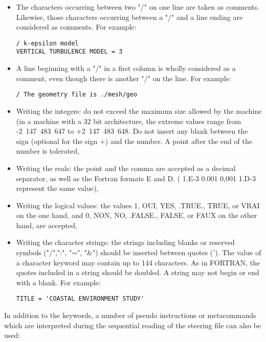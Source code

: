 \begin{itemize}
\item The characters occurring between two "/" on one line are taken as
comments. Likewise, those characters occurring between a "/" and a line ending
are considered as comments. For example:

\begin{lstlisting}[language=TelemacCas]
/ k-epsilon model
VERTICAL TURBULENCE MODEL = 3
\end{lstlisting}

\item A line beginning with a "/" in a first column is wholly considered as a
comment, even though there is another "/" on the line. For example:

\begin{lstlisting}[language=TelemacCas]
/ The geometry file is ./mesh/geo
\end{lstlisting}

\item Writing the integers: do not exceed the maximum size allowed by the
machine (in a machine with a 32 bit architecture, the extreme values range from
-2~147~483~647 to +2~147~483~648. Do not insert any blank between the sign
(optional for the sign +) and the number. A point after the end of the number
is tolerated,

\item Writing the reals: the point and the comma are accepted as a decimal
separator, as well as the Fortran formats E and D. ( 1.E-3  0.001  0,001  1.D-3
represent the same value),

\item Writing the logical values: the values 1, OUI,  YES,  .TRUE.,  TRUE,  or
VRAI on the one hand, and 0, NON,  NO,  .FALSE.,  FALSE, or FAUX on the other
hand, are accepted,

\item Writing the character strings: the strings including blanks or reserved
symbols ("/",":", "=", "\&") should be inserted between quotes ('). The value
of a character keyword may contain up to 144 characters. As in FORTRAN, the
quotes included in a string should be doubled. A string may not begin or end
with a blank. For example:

\begin{lstlisting}[language=TelemacCas]
TITLE = 'COASTAL ENVIRONMENT STUDY'
\end{lstlisting}

\end{itemize}

In addition to the keywords, a number of pseudo instructions or metacommands
which are interpreted during the sequential reading of the steering file can
also be used:

